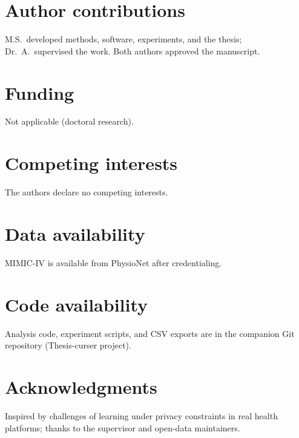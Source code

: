 \section*{Author contributions}
M.S.\ developed methods, software, experiments, and the thesis; Dr.\ A.\ supervised the work. Both authors approved the manuscript.

\section*{Funding}
Not applicable (doctoral research).

\section*{Competing interests}
The authors declare no competing interests.

\section*{Data availability}
MIMIC-IV is available from PhysioNet after credentialing.

\section*{Code availability}
Analysis code, experiment scripts, and CSV exports are in the companion Git repository (Thesis-curser project).

\section*{Acknowledgments}
Inspired by challenges of learning under privacy constraints in real health platforms; thanks to the supervisor and open-data maintainers.
